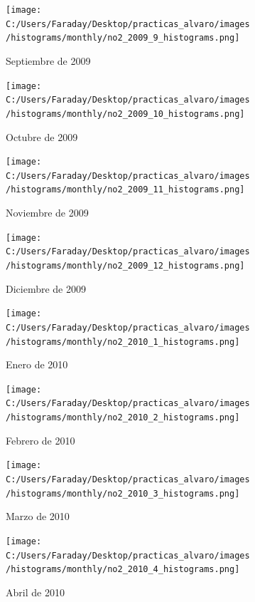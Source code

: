 \documentclass[12pt]{article}
\begin{document}
\begin{figure}[H]
\centering
\begin{subfigure}[h]{0.45\textwidth}
\texttt{[image: C:/Users/Faraday/Desktop/practicas\_alvaro/images/histograms/monthly/no2\_2009\_9\_histograms.png]}
\caption{Septiembre de 2009}
\label{fig:hist-mon-1-9-2009}
\end{subfigure}
%
\begin{subfigure}[H]{0.45\textwidth}
\texttt{[image: C:/Users/Faraday/Desktop/practicas\_alvaro/images/histograms/monthly/no2\_2009\_10\_histograms.png]}
\caption{Octubre de 2009}
\label{fig:hist-mon-1-10-2009}
\end{subfigure}
\caption{}
\end{figure}

\begin{figure}[H]
\centering
\begin{subfigure}[h]{0.45\textwidth}
\texttt{[image: C:/Users/Faraday/Desktop/practicas\_alvaro/images/histograms/monthly/no2\_2009\_11\_histograms.png]}
\caption{Noviembre de 2009}
\label{fig:hist-mon-1-11-2009}
\end{subfigure}
%
\begin{subfigure}[H]{0.45\textwidth}
\texttt{[image: C:/Users/Faraday/Desktop/practicas\_alvaro/images/histograms/monthly/no2\_2009\_12\_histograms.png]}
\caption{Diciembre de 2009}
\label{fig:hist-mon-1-12-2009}
\end{subfigure}
\caption{}
\end{figure}

\newpage

\begin{figure}[H]
\centering
\begin{subfigure}[h]{0.45\textwidth}
\texttt{[image: C:/Users/Faraday/Desktop/practicas\_alvaro/images/histograms/monthly/no2\_2010\_1\_histograms.png]}
\caption{Enero de 2010}
\label{fig:hist-mon-1-1-2010}
\end{subfigure}
%
\begin{subfigure}[H]{0.45\textwidth}
\texttt{[image: C:/Users/Faraday/Desktop/practicas\_alvaro/images/histograms/monthly/no2\_2010\_2\_histograms.png]}
\caption{Febrero de 2010}
\label{fig:hist-mon-1-2-2010}
\end{subfigure}
\caption{}
\end{figure}

\begin{figure}[H]
\centering
\begin{subfigure}[h]{0.45\textwidth}
\texttt{[image: C:/Users/Faraday/Desktop/practicas\_alvaro/images/histograms/monthly/no2\_2010\_3\_histograms.png]}
\caption{Marzo de 2010}
\label{fig:hist-mon-1-3-2010}
\end{subfigure}
%
\begin{subfigure}[H]{0.45\textwidth}
\texttt{[image: C:/Users/Faraday/Desktop/practicas\_alvaro/images/histograms/monthly/no2\_2010\_4\_histograms.png]}
\caption{Abril de 2010}
\label{fig:hist-mon-1-4-2010}
\end{subfigure}
\caption{}
\end{figure}
\end{document}
